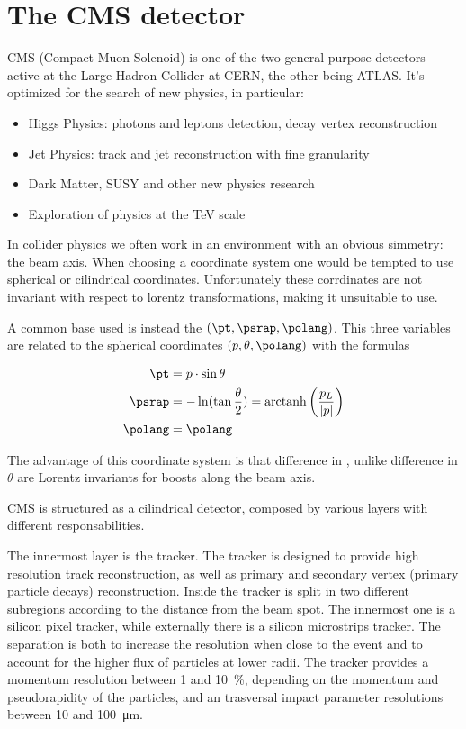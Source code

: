 \section{The CMS detector}

CMS (Compact Muon Solenoid) is one of the two general purpose detectors active at the Large Hadron Collider at CERN, the other being ATLAS.
It's optimized for the search of new physics, in particular:
\begin{itemize}
	\item Higgs Physics: photons and leptons detection, decay vertex reconstruction
	\item Jet Physics: track and jet reconstruction with fine granularity
	\item Dark Matter, SUSY and other new physics research
	\item Exploration of physics at the TeV scale
\end{itemize}

In collider physics we often work in an environment with an obvious simmetry: the beam axis.
When choosing a coordinate system one would be tempted to use spherical or cilindrical coordinates.
Unfortunately these corrdinates are not invariant with respect to lorentz transformations, making it unsuitable to use.

A common base used is instead the $\left(\pt,\psrap,\polang\right)$.
This three variables are related to the spherical coordinates $\left(p,\theta,\polang\right)$ with the formulas


\begin{align}
	\pt&=p\cdot\sin{\theta}\\
	\psrap&=-\ln(\tan{\frac{\theta}{2}})=\mathrm{arctanh}\left(\frac{p_L}{|p|}\right)\\
	\polang&=\polang
	\label{eq:pt_eta_phi}
\end{align}

The advantage of this coordinate system is that difference in \psrap, unlike difference in $\theta$ are Lorentz invariants for boosts along the beam axis.


CMS is structured as a cilindrical detector, composed by various layers with different responsabilities.

The innermost layer is the tracker.
The tracker is designed to provide high resolution track reconstruction, as well as primary and secondary vertex (primary particle decays) reconstruction.
Inside the tracker is split in two different subregions according to the distance from the beam spot.
The innermost one is a silicon pixel tracker, while externally there is a silicon microstrips tracker.
The separation is both to increase the resolution when close to the event and to account for the higher flux of particles at lower radii.
The tracker provides a momentum resolution between \num{1} and \SI{10}{\percent}, depending on the momentum and pseudorapidity of the particles, and an trasversal impact parameter resolutions between \num{10} and \SI{100}{\micro\m}.

